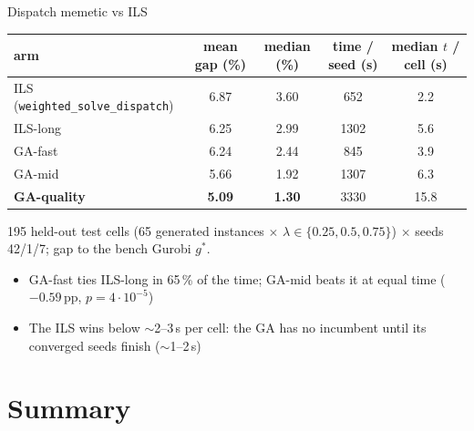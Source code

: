 \documentclass[aspectratio=169,t]{beamer}
\newcommand{\code}[1]{\texttt{#1}}
\begin{document}
\begin{frame}{Dispatch memetic vs ILS}
  \begin{center}
  \footnotesize
  \begin{tabular}{lcccc}
    \toprule
    arm & mean gap (\%) & median (\%) & time / seed (s) & median $t$ / cell (s) \\
    \midrule
    ILS (\code{weighted\_solve\_dispatch}) & 6.87 & 3.60 & 652  & 2.2 \\
    ILS-long                               & 6.25 & 2.99 & 1302 & 5.6 \\
    GA-fast                                & 6.24 & 2.44 & 845  & 3.9 \\
    GA-mid                                 & 5.66 & 1.92 & 1307 & 6.3 \\
    \textbf{GA-quality}                    & \textbf{5.09} & \textbf{1.30} & 3330 & 15.8 \\
    \bottomrule
  \end{tabular}
  \end{center}
  \scriptsize 195 held-out test cells (65 generated instances $\times$
  $\lambda \in \{0.25, 0.5, 0.75\}$) $\times$ seeds 42/1/7; gap to the bench
  Gurobi $g^*$.
  \small
  \begin{itemize}
    \item GA-fast ties ILS-long in 65\,\% of the time; GA-mid beats it at equal
      time ($-0.59$\,pp, $p = 4\cdot10^{-5}$)
    \item The \alert{ILS wins below $\sim$2--3\,s per cell}: the GA has no
      incumbent until its converged seeds finish ($\sim$1--2\,s)
  \end{itemize}
\end{frame}

\section{Summary}
\end{document}
